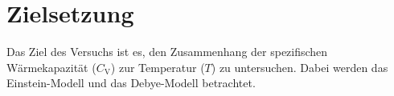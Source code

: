 \section{Zielsetzung}
Das Ziel des Versuchs ist es, den Zusammenhang der spezifischen Wärmekapazität ($C_\text{V}$) zur Temperatur ($T$) zu untersuchen.
Dabei werden das Einstein-Modell und das Debye-Modell betrachtet.  
